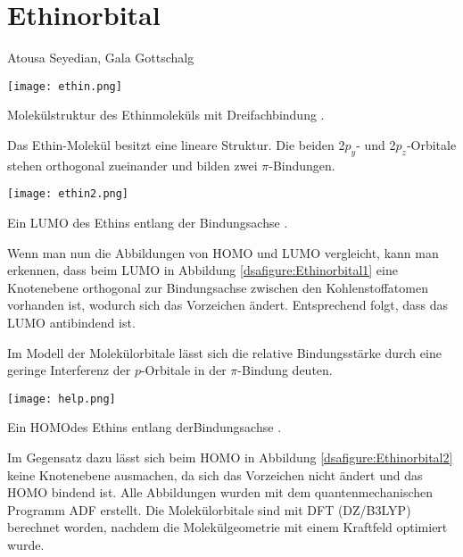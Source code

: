 \section{Ethinorbital}
Atousa Seyedian, Gala Gottschalg 
 
\begin{dsafigure}
 \centering
 \texttt{[image: ethin.png]} 
 \caption{Molekülstruktur des Ethinmoleküls mit Dreifachbindung \cite{ADF2017authors}.}
 \label{dsafigure}
\end{dsafigure} 

Das Ethin-Molekül besitzt eine lineare Struktur. Die beiden 2$p_y$- und 2$p_z$-Orbitale stehen orthogonal zueinander und bilden zwei $\pi$-Bindungen.

\begin{dsafigure}
 \centering
 \texttt{[image: ethin2.png]}
 \caption{Ein LUMO des Ethins entlang der Bindungsachse \cite{ADF2017authors}.}
 \label{dsafigure:Ethinorbital1}
\end{dsafigure}
 
Wenn man nun die Abbildungen von HOMO und LUMO vergleicht, kann man erkennen, dass beim LUMO in Abbildung \ref{dsafigure:Ethinorbital1} eine Knotenebene orthogonal zur Bindungsachse zwischen den Kohlenstoffatomen vorhanden ist, wodurch sich das Vorzeichen ändert. Entsprechend folgt, dass das LUMO antibindend ist.

Im Modell der Molekülorbitale lässt sich die relative Bindungsstärke durch eine geringe Interferenz der $p$-Orbitale in der $\pi$-Bindung deuten.

\begin{dsafigure}
 \centering
 \texttt{[image: help.png]}
 \caption{Ein HOMOdes Ethins entlang derBindungsachse \cite{ADF2017authors}.}
 \label{dsafigure:Ethinorbital2}
\end{dsafigure}

Im Gegensatz dazu lässt sich beim HOMO in Abbildung \ref{dsafigure:Ethinorbital2} keine Knotenebene ausmachen, da sich das Vorzeichen nicht ändert und das HOMO bindend ist.
Alle Abbildungen wurden mit dem quantenmechanischen Programm ADF erstellt. Die Molekülorbitale sind mit DFT (DZ/B3LYP) berechnet worden, nachdem die Molekülgeometrie mit einem Kraftfeld optimiert wurde.
